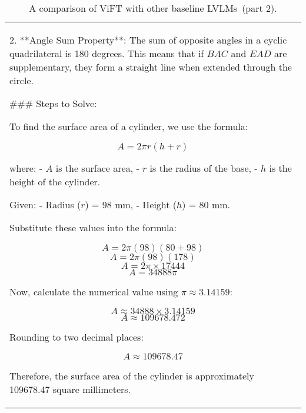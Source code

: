 \begin{table*}[htbp]
\begin{tabular}{p{14cm}}
\begin{tcolorbox}[colback=gray!5, colframe=gray!40, sharp corners, width=\linewidth, boxrule=0.5mm]
2. **Angle Sum Property**: The sum of opposite angles in a cyclic quadrilateral is 180 degrees. This means that if \( BAC \) and \( EAD \) are supplementary, they form a straight line when extended through the circle.

\#\#\# Steps to Solve:

To find the surface area of a cylinder, we use the formula:

\[ A = 2\pi r(h + r) \]

where:
- \( A \) is the surface area,
- \( r \) is the radius of the base,
- \( h \) is the height of the cylinder.

Given:
- Radius (\( r \)) = 98 mm,
- Height (\( h \)) = 80 mm.

Substitute these values into the formula:

\[ A = 2\pi (98)(80 + 98) \]
\[ A = 2\pi (98)(178) \]
\[ A = 2\pi \times 17444 \]
\[ A = 34888\pi \]

Now, calculate the numerical value using \(\pi \approx 3.14159\):

\[ A \approx 34888 \times 3.14159 \]
\[ A \approx 109678.472 \]

Rounding to two decimal places:

\[ A \approx 109678.47 \]

Therefore, the surface area of the cylinder is approximately 109678.47 square millimeters.

\end{tcolorbox}
\end{tabular}
\caption{A comparison of ViFT with other baseline LVLMs~(part 2).}
\end{table*}



